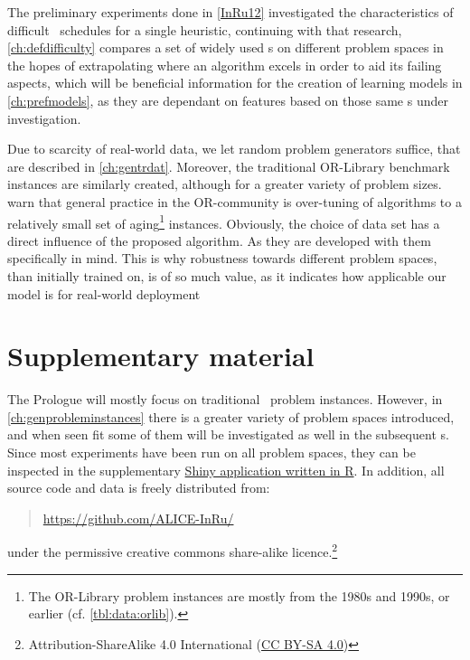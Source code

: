 The preliminary experiments done in \cref{InRu12} investigated the 
characteristics of difficult \jsp\ schedules for a single heuristic, continuing 
with that research, \cref{ch:defdifficulty} compares a set of widely used 
\dr s on different problem spaces in the hopes of extrapolating 
where an algorithm excels in order to aid its failing aspects, which will be 
beneficial information for the creation of learning models in 
\cref{ch:prefmodels}, as they are dependant  on features based on those same 
\dr s under investigation.

Due to scarcity of real-world data, we let random problem generators 
suffice, that are described in \cref{ch:gentrdat}. Moreover, the traditional 
OR-Library benchmark instances are similarly created, although for a greater 
variety of problem sizes. 
\citet{SmithMiles2015} warn that general practice in the OR-community is 
over-tuning of algorithms to a relatively small set of aging\footnote{
    The OR-Library problem instances are mostly from the 1980s and 
    1990s, or earlier (cf. \cref{tbl:data:orlib}).}
instances. 
Obviously, the choice of data set has a direct influence of the proposed 
algorithm. As they are developed with them specifically in mind. 
This is why robustness towards different problem spaces, than initially trained 
on, is of so much value, as it indicates how applicable our model is for 
real-world deployment 


\section{Supplementary material}
The Prologue will mostly focus on traditional \jsp\ problem instances. 
However, in \cref{ch:genprobleminstances} there is a greater variety of problem 
spaces introduced, and when seen fit some of them will be investigated as well 
in the subsequent s. 
Since most experiments have been run on all problem spaces, they can be 
inspected in the supplementary \href{http://tgax89.rhi.hi.is:3838/alice}{Shiny 
    application written in R}. 
In addition, all source code and data is freely distributed from:
\begin{quote}
    \url{https://github.com/ALICE-InRu/}
\end{quote}
under the permissive creative commons share-alike 
licence.\footnote{Attribution-ShareAlike 4.0 International 
    (\href{http://creativecommons.org/licenses/by-sa/4.0/}{CC BY-SA 4.0})}
